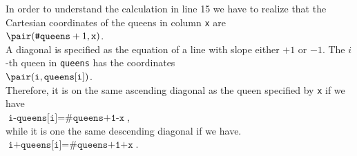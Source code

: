 \begin{enumerate}
      In order to understand the calculation in line 15 we have to realize that the
      Cartesian coordinates of the queens in column \texttt{x} are 
      \\[0.2cm]
      \hspace*{1.3cm}
      $\pair(\texttt{\#queens}+1, \mathtt{x})$.
      \\[0.2cm]
      A diagonal is specified as the equation of a line with slope either $+1$ or $-1$.
      The $i$-th  queen in \texttt{queens} has the coordinates
      \\[0.2cm]
      \hspace*{1.3cm}
      $\pair(\texttt{i}, \mathtt{queens[i]})$.      
      \\[0.2cm]
      Therefore, it is on the same ascending diagonal as the queen specified by \texttt{x} if
      we have
      \\[0.2cm]
      \hspace*{1.3cm}
      $\texttt{i-queens[i]} = \texttt{\#queens+1-x}$,
      \\[0.2cm]
      while it is one the same descending diagonal if we have.
      \\[0.2cm]
      \hspace*{1.3cm}
      $\texttt{i+queens[i]} = \texttt{\#queens+1+x}$.
\end{enumerate}

